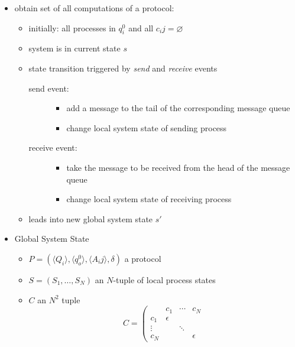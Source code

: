 \documentclass[a4paper, 10pt]{article}
\begin{document}
\begin{itemize}
    \item obtain set of all computations of a protocol:
    \begin{itemize}
        \item initially: all processes in $q_i^0$ and all $c_ij=\varnothing$
        \item system is in current state $s$
        \item state transition triggered by \emph{send} and \emph{receive} events
        \begin{description}
            \item[send event:]
            \begin{itemize}
                \item add a message to the tail of the corresponding message queue
                \item change local system state of sending process
            \end{itemize}
            \item[receive event:]
            \begin{itemize}
                \item take the message to be received from the head of the message queue
                \item change local system state of receiving process
            \end{itemize}
        \end{description}
        \item leads into new global system state $s'$
    \end{itemize}
    \item Global System State
    \begin{itemize}
        \item $P=\left(\langle Q_i\rangle,\langle q_o^0 \rangle, \langle A_ij \rangle,\delta \right)$ a protocol
        \item $S=(S_1,\dots,S_N)$ an $N$-tuple of local process states
        \item $C$ an $N^2$ tuple \\
        \[C= \left(
        \begin{array}{cccc}
         & c_1 & \cdots & c_N \\
         c_1 & \epsilon & & \\
         \vdots & & \ddots & \\
         c_N & & & \epsilon
        \end{array}
\]
\end{itemize}
\end{itemize}
\end{document}
